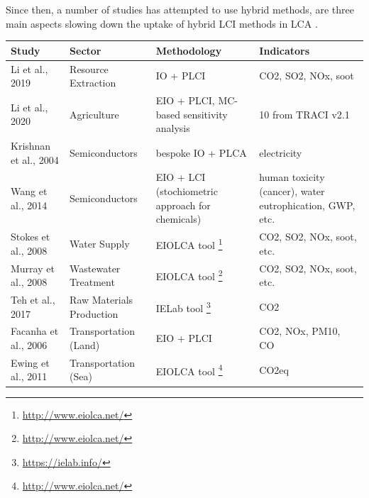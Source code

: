 \documentclass{article}
\begin{document}
        Since then, a number of studies has attempted to use hybrid methods, 
        are three main aspects slowing down the uptake of hybrid LCI methods in LCA \cite{crawford_hybrid_2018}.
        
        \begin{table}[H]
            \centering
            \begin{tabularx}{\textwidth}{| X | X | X | X |}
                \hline
                    \textbf{Study} & \textbf{Sector} & \textbf{Methodology} & \textbf{Indicators} \\
                \hline
                    Li et al., 2019 \cite{li_economic_2019} & Resource Extraction & IO + PLCI & CO2, SO2, NOx, soot \\
                \hline
                    Li et al., 2020 \cite{li_life_2020} & Agriculture & EIO + PLCI, MC-based sensitivity analysis & 10 from TRACI v2.1 \\ %
                \hline
                    Krishnan et al., 2004 \cite{krishnan_using_2004} & Semiconductors & bespoke IO + PLCA & electricity \\
                \hline
                    Wang et al., 2014 \cite{wang_hybrid_2014} & Semiconductors & EIO + LCI (stochiometric approach for chemicals) & human toxicity (cancer), water eutrophication, GWP, etc. \\
                \hline
                    Stokes et al., 2008 \cite{stokes_energy_2009} & Water Supply & EIOLCA tool \footnote{\url{http://www.eiolca.net/}} & CO2, SO2, NOx, soot, etc. \\
                \hline
                    Murray et al., 2008 \cite{murray_hybrid_2008} & Wastewater Treatment & EIOLCA tool \footnote{\url{http://www.eiolca.net/}} & CO2, SO2, NOx, soot, etc. \\
                \hline
                    Teh et al., 2017 \cite{teh_hybrid_2017} & Raw Materials Production & IELab tool \footnote{\url{https://ielab.info/}} & CO2 \\
                \hline
                    Facanha et al., 2006 \cite{horvath_environmental_2006} & Transportation (Land) & EIO + PLCI & CO2, NOx, PM10, CO \\
                \hline
                    Ewing et al., 2011 \cite{ewing_insights_2011} & Transportation (Sea) & EIOLCA tool \footnote{\url{http://www.eiolca.net/}} & CO2eq \\

\end{tabularx}
\end{table}
\end{document}
